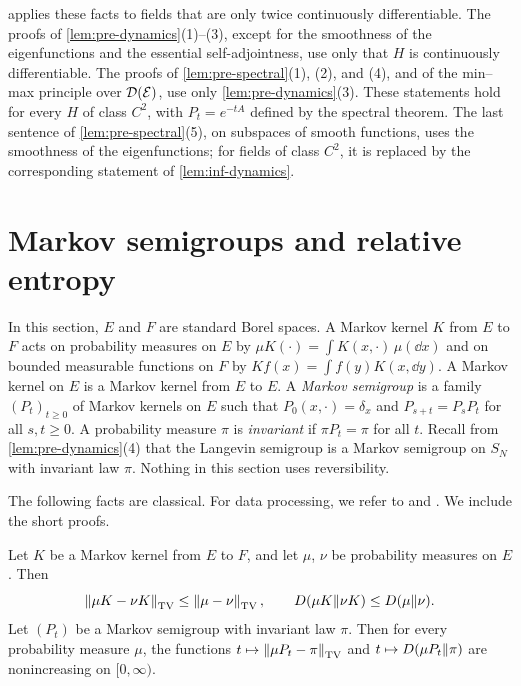 \begin{remark}\label{rem:pre-C2}
 applies these facts to fields that are only twice continuously differentiable. The proofs of \cref{lem:pre-dynamics}(1)--(3), except for the smoothness of the eigenfunctions and the essential self-adjointness, use only that $H$ is continuously differentiable. The proofs of \cref{lem:pre-spectral}(1), (2), and (4), and of the min--max principle over $\mathcal D(\mathcal E)$, use only \cref{lem:pre-dynamics}(3). These statements hold for every $H$ of class $C^2$, with $P_t=e^{-tA}$ defined by the spectral theorem. The last sentence of \cref{lem:pre-spectral}(5), on subspaces of smooth functions, uses the smoothness of the eigenfunctions; for fields of class $C^2$, it is replaced by the corresponding statement of \cref{lem:inf-dynamics}.
\end{remark}

\section{Markov semigroups and relative entropy}\label{sec:pre-entropy}

In this section, $E$ and $F$ are standard Borel spaces. A Markov kernel $K$ from $E$ to $F$ acts on probability measures on $E$ by $\mu K(\cdot)=\int K(x,\cdot)\,\mu(\dd x)$ and on bounded measurable functions on $F$ by $Kf(x)=\int f(y)K(x,\dd y)$. A Markov kernel on $E$ is a Markov kernel from $E$ to $E$. A \emph{Markov semigroup} is a family $(P_t)_{t\ge0}$ of Markov kernels on $E$ such that $P_0(x,\cdot)=\delta_x$ and $P_{s+t}=P_sP_t$ for all $s,t\ge0$. A probability measure $\pi$ is \emph{invariant} if $\pi P_t=\pi$ for all $t$. Recall from \cref{lem:pre-dynamics}(4) that the Langevin semigroup is a Markov semigroup on $S_N$ with invariant law $\pi$. Nothing in this section uses reversibility.

The following facts are classical. For data processing, we refer to \cite{Csiszar1967} and \cite[Theorem~2.17 and Corollary~2.18]{PolyanskiyWu2025}. We include the short proofs.

\begin{lemma}[Contraction]\label{lem:pre-contraction}
Let $K$ be a Markov kernel from $E$ to $F$, and let $\mu$, $\nu$ be probability measures on $E$. Then
\[
\left\lVert\mu K-\nu K\right\rVert_{\mathrm{TV}}\le\left\lVert\mu-\nu\right\rVert_{\mathrm{TV}},\qquad D(\mu K\|\nu K)\le D(\mu\|\nu).
\]
Let $(P_t)$ be a Markov semigroup with invariant law $\pi$. Then for every probability measure $\mu$, the functions $t\mapsto\left\lVert\mu P_t-\pi\right\rVert_{\mathrm{TV}}$ and $t\mapsto D(\mu P_t\|\pi)$ are nonincreasing on $[0,\infty)$.
\end{lemma}

